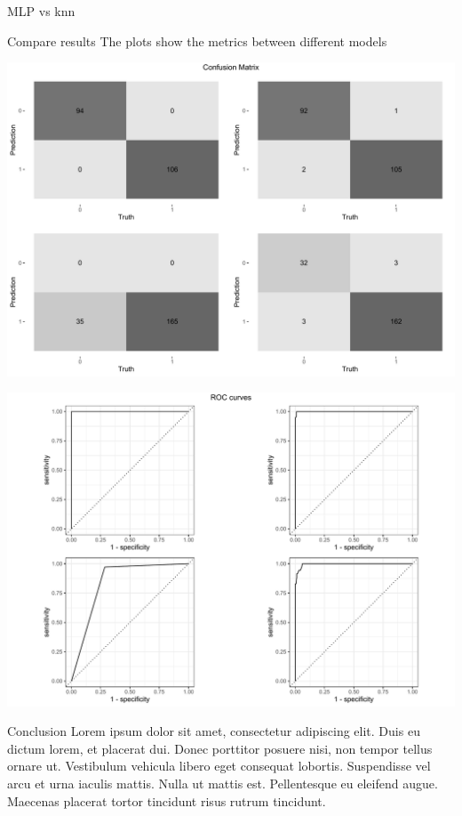 \documentclass[
  ignorenonframetext,
]{article}
\begin{document}
\begin{frame}[fragile]{MLP vs knn}
\begin{block}{Compare results}
The plots show the metrics between different models

\begin{center}\includegraphics{_main_files/figure-beamer/unnamed-chunk-96-1} \end{center}

\begin{center}\includegraphics{_main_files/figure-beamer/unnamed-chunk-97-1} \end{center}
\end{block}

\begin{block}{Conclusion}
\protect\hypertarget{conclusion-6}{}
Lorem ipsum dolor sit amet, consectetur adipiscing elit. Duis eu dictum lorem, et placerat dui. Donec porttitor posuere nisi, non tempor tellus ornare ut. Vestibulum vehicula libero eget consequat lobortis. Suspendisse vel arcu et urna iaculis mattis. Nulla ut mattis est. Pellentesque eu eleifend augue. Maecenas placerat tortor tincidunt risus rutrum tincidunt.
\end{block}


\end{frame}
\end{document}
